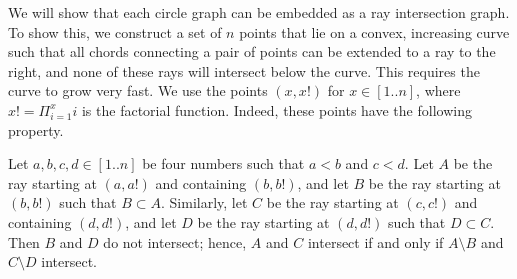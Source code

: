 \documentclass[]{llncs}
\begin{document}
We will show that each circle graph can be embedded as a ray intersection graph. To show this, we construct a set of \(n\) points that lie on a convex, increasing curve such that all chords connecting a pair of points can be extended to a ray to the right, and none of these rays will intersect below the curve. This requires the curve to grow very fast. We use the points \((x,x!)\) for \(x \in [1 .. n]\), where $x! = \Pi_{i=1}^x i$ is the factorial function. 
Indeed, these points have the following property.

\begin {lemma}
\label{lem:case1}
  Let $a, b, c, d \in [1 .. n]$ be four numbers such that $a < b$ and $c < d$. 
  Let $A$ be the ray starting at $(a, a!)$ and containing $(b, b!)$,
  and let $B$ be the ray starting at $(b, b!)$ such that $B \subset A$.
  Similarly, let $C$ be the ray starting at $(c, c!)$ and containing $(d, d!)$,
  and let $D$ be the ray starting at $(d, d!)$ such that $D \subset C$.
  Then $B$ and $D$ do not intersect; hence, $A$ and $C$ intersect if and only if $A \setminus B$ and $C \setminus D$ intersect.
\end {lemma}
\end{document}
